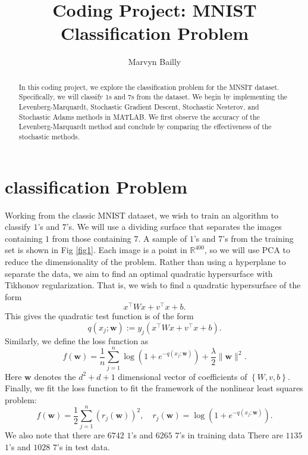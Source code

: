 \documentclass[12pt]{article}%
\def\R{{\mathbb R}}
\newcommand{\brac}[1]{{\left\{#1\right\}}} %
\begin{document}
\title{Coding Project:  MNIST Classification Problem}

\author{Marvyn Bailly}
\date{}

\maketitle


\begin{abstract}
In this coding project, we explore the classification problem for the MNSIT dataset. Specifically, we will classify $1$s and $7$s from the dataset. We begin by implementing the Levenberg-Marquardt, Stochastic Gradient Descent, Stochastic Nesterov, and Stochastic Adams methods in MATLAB. We first observe the accuracy of the Levenberg-Marquardt method and conclude by comparing the effectiveness of the stochastic methods. 
\end{abstract}

\section{classification Problem}
Working from the classic MNIST dataset, we wish to train an algorithm to classify $1$'s and $7$'s. We will use a dividing surface that separates the images containing $1$ from those containing $7$. A sample of $1$'s and $7$'s from the training set is shown in Fig \ref{fig1}. Each image is a point in $\R^{400}$, so we will use PCA to reduce the dimensionality of the problem. Rather than using a hyperplane to separate the data, we aim to find an optimal quadratic hypersurface with Tikhonov regularization. That is, we wish to find a quadratic hypersurface of the form
\begin{equation*}
    x^\top W x + v^\top x + b.
\end{equation*}
This gives the quadratic test function is of the form
\begin{equation}\label{equation 3}
    q(x_j;\mathbf{w}) := y_j (x^\top W x + v^\top x + b).
\end{equation}
Similarly, we define the loss function as
\begin{equation}\label{equation 4}
    f(\mathbf{w}) = \frac{1}{n} \sum_{j=1}^n \log(1 + e^{-q(x_j ; \mathbf{w})}) + \frac{\lambda}{2}\|\mathbf{w}\|^2.
\end{equation}
Here $\mathbf{w}$ denotes the $d^2 + d + 1$ dimensional vector of coefficients of $\brac{W,v,b}$. Finally, we fit the loss function to fit the framework of the nonlinear least squares problem:
\begin{equation}\label{equation 5}
    f(\mathbf{w}) = \frac{1}{2} \sum_{j=1}^n (r_j(\mathbf{w}))^2, \quad r_j(\mathbf{w}) = \log(1  + e^{-q(x_j; \mathbf{w})}).
\end{equation}
We also note that there are $6742$ $1$'s and $6265$ $7$'s in training data
There are $1135$ $1$'s and $1028$ $7$'s in test data.
\end{document}
